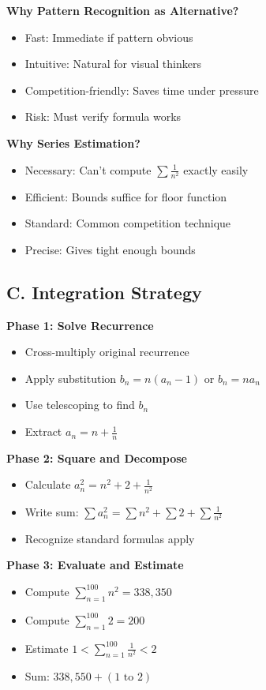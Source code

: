 \documentclass[12pt]{article}
\begin{document}
\begin{techniquesbox}
\textbf{Why Pattern Recognition as Alternative?}
\begin{itemize}
    \item Fast: Immediate if pattern obvious
    \item Intuitive: Natural for visual thinkers
    \item Competition-friendly: Saves time under pressure
    \item Risk: Must verify formula works
\end{itemize}

\textbf{Why Series Estimation?}
\begin{itemize}
    \item Necessary: Can't compute $\sum \frac{1}{n^2}$ exactly easily
    \item Efficient: Bounds suffice for floor function
    \item Standard: Common competition technique
    \item Precise: Gives tight enough bounds
\end{itemize}

\subsection*{C. Integration Strategy}

\textbf{Phase 1: Solve Recurrence}
\begin{itemize}
    \item Cross-multiply original recurrence
    \item Apply substitution $b_n = n(a_n-1)$ or $b_n = na_n$
    \item Use telescoping to find $b_n$
    \item Extract $a_n = n + \frac{1}{n}$
\end{itemize}

\textbf{Phase 2: Square and Decompose}
\begin{itemize}
    \item Calculate $a_n^2 = n^2 + 2 + \frac{1}{n^2}$
    \item Write sum: $\sum a_n^2 = \sum n^2 + \sum 2 + \sum \frac{1}{n^2}$
    \item Recognize standard formulas apply
\end{itemize}

\textbf{Phase 3: Evaluate and Estimate}
\begin{itemize}
    \item Compute $\sum_{n=1}^{100} n^2 = 338,350$
    \item Compute $\sum_{n=1}^{100} 2 = 200$
    \item Estimate $1 < \sum_{n=1}^{100} \frac{1}{n^2} < 2$
    \item Sum: $338,550 + (1 \text{ to } 2)$
\end{itemize}


\end{techniquesbox}
\end{document}
